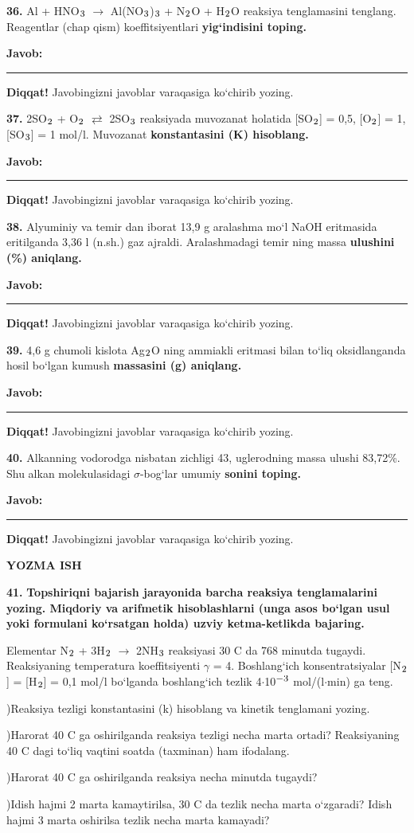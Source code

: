 \documentclass[11pt,a4paper]{article}
\renewcommand{\textsubscript}[1]{\ensuremath{_{\text{\fontsize{8}{8}\selectfont #1}}}}
\renewcommand{\textsuperscript}[1]{\ensuremath{^{\text{\fontsize{8}{8}\selectfont #1}}}}
\newcommand{\javob}{\par\smallskip\noindent\textbf{Javob:} \rule[-2pt]{7.5cm}{0.4pt}\par\smallskip\noindent\textbf{Diqqat!} Javobingizni javoblar varaqasiga ko`chirib yozing.\par\medskip}
\begin{document}
\par\bigskip
\noindent\textbf{36.} Al + HNO\textsubscript{3} $\to$ Al(NO\textsubscript{3})\textsubscript{3} + N\textsubscript{2}O + H\textsubscript{2}O reaksiya tenglamasini tenglang. Reagentlar (chap qism) koeffitsiyentlari \textbf{yig`indisini toping.}
\javob
\noindent\textbf{37.} 2SO\textsubscript{2} + O\textsubscript{2} $\rightleftarrows$ 2SO\textsubscript{3} reaksiyada muvozanat holatida [SO\textsubscript{2}] = 0,5, [O\textsubscript{2}] = 1, [SO\textsubscript{3}] = 1 mol/l. Muvozanat \textbf{konstantasini (K) hisoblang.}
\javob
\noindent\textbf{38.} Alyuminiy va temir dan iborat 13,9 g aralashma mo`l NaOH eritmasida eritilganda 3,36 l (n.sh.) gaz ajraldi. Aralashmadagi temir ning massa \textbf{ulushini (\%) aniqlang.}
\javob
\noindent\textbf{39.} 4,6 g chumoli kislota Ag\textsubscript{2}O ning ammiakli eritmasi bilan to`liq oksidlanganda hosil bo`lgan kumush \textbf{massasini (g) aniqlang.}
\javob
\noindent\textbf{40.} Alkanning vodorodga nisbatan zichligi 43, uglerodning massa ulushi 83,72\%. Shu alkan molekulasidagi $\sigma$-bog`lar umumiy \textbf{sonini toping.}
\javob
\par\bigskip\begin{center}\textbf{\fontsize{13}{15}\selectfont YOZMA ISH}\end{center}
\noindent\textbf{41.} \textbf{Topshiriqni bajarish jarayonida barcha reaksiya tenglamalarini yozing. Miqdoriy va arifmetik hisoblashlarni (unga asos bo`lgan usul yoki formulani ko`rsatgan holda) uzviy ketma-ketlikda bajaring.}\par\smallskip
Elementar N\textsubscript{2} + 3H\textsubscript{2} $\to$ 2NH\textsubscript{3} reaksiyasi 30 \textdegree{}C da 768 minutda tugaydi. Reaksiyaning temperatura koeffitsiyenti $\gamma$ = 4. Boshlang`ich konsentratsiyalar [N\textsubscript{2}] = [H\textsubscript{2}] = 0,1 mol/l bo`lganda boshlang`ich tezlik 4$\cdot$10\textsuperscript{$-$3} mol/(l$\cdot$min) ga teng.\par
{})Reaksiya tezligi konstantasini (k) hisoblang va kinetik tenglamani yozing.\par
{})Harorat 40 \textdegree{}C ga oshirilganda reaksiya tezligi necha marta ortadi? Reaksiyaning 40 \textdegree{}C dagi to`liq vaqtini soatda (taxminan) ham ifodalang.\par
{})Harorat 40 \textdegree{}C ga oshirilganda reaksiya necha minutda tugaydi?\par
{})Idish hajmi 2 marta kamaytirilsa, 30 \textdegree{}C da tezlik necha marta o`zgaradi? Idish hajmi 3 marta oshirilsa tezlik necha marta kamayadi?\par
\end{document}
